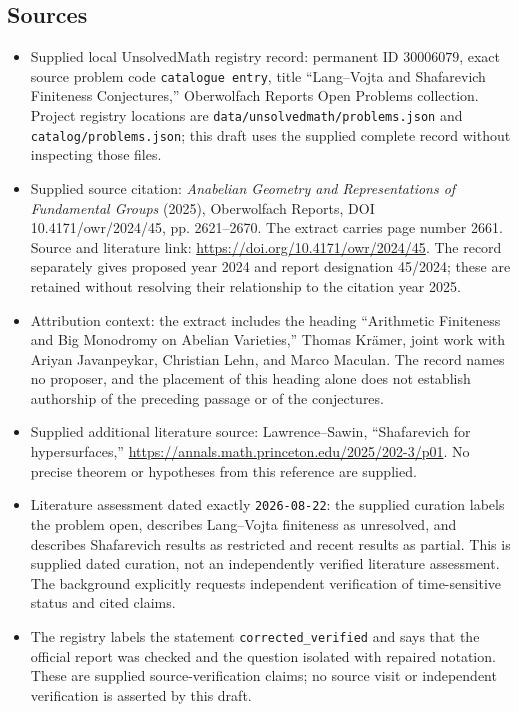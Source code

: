 \documentclass[11pt]{article}
\begin{document}
\subsection{Sources}
\begin{itemize}
\item Supplied local UnsolvedMath registry record: permanent ID \(30006079\), exact source problem code \texttt{catalogue entry}, title ``Lang--Vojta and Shafarevich Finiteness Conjectures,'' Oberwolfach Reports Open Problems collection. Project registry locations are \texttt{data/unsolvedmath/problems.json} and \texttt{catalog/problems.json}; this draft uses the supplied complete record without inspecting those files.
\item Supplied source citation: \emph{Anabelian Geometry and Representations of Fundamental Groups} (2025), Oberwolfach Reports, DOI 10.4171/owr/2024/45, pp. 2621--2670. The extract carries page number 2661. Source and literature link: \url{https://doi.org/10.4171/owr/2024/45}. The record separately gives proposed year 2024 and report designation 45/2024; these are retained without resolving their relationship to the citation year 2025.
\item Attribution context: the extract includes the heading ``Arithmetic Finiteness and Big Monodromy on Abelian Varieties,'' Thomas Kr\"amer, joint work with Ariyan Javanpeykar, Christian Lehn, and Marco Maculan. The record names no proposer, and the placement of this heading alone does not establish authorship of the preceding passage or of the conjectures.
\item Supplied additional literature source: Lawrence--Sawin, ``Shafarevich for hypersurfaces,'' \url{https://annals.math.princeton.edu/2025/202-3/p01}. No precise theorem or hypotheses from this reference are supplied.
\item Literature assessment dated exactly \texttt{2026-08-22}: the supplied curation labels the problem open, describes Lang--Vojta finiteness as unresolved, and describes Shafarevich results as restricted and recent results as partial. This is supplied dated curation, not an independently verified literature assessment. The background explicitly requests independent verification of time-sensitive status and cited claims.
\item The registry labels the statement \texttt{corrected\_verified} and says that the official report was checked and the question isolated with repaired notation. These are supplied source-verification claims; no source visit or independent verification is asserted by this draft.
\end{itemize}
\end{document}

